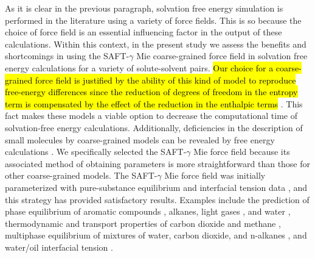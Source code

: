 \documentclass[final,12p,times,twocolumn]{elsarticle}
\begin{document}
	As it is clear in the previous paragraph, solvation free energy simulation is performed in the literature using a variety of force fields. This is so because the choice of force field is an essential influencing factor in the output of these calculations. Within this context, in the present study we assess the benefits and shortcomings in using the SAFT-$\gamma$ Mie coarse-grained force field \cite{avendano2011} in solvation free energy calculations for a variety of solute-solvent pairs. \hl{Our choice for a coarse-grained force field is justified by the ability of this kind of model to reproduce free-energy differences since the reduction of degrees of freedom in the entropy term is compensated by the effect of the reduction in the enthalpic terms} \cite{kmiecik2016}. This fact makes these models a viable option to decrease the computational time of solvation-free energy calculations. Additionally, deficiencies in the description of small molecules by coarse-grained models can be revealed by free energy calculations \cite{mobley2007,shirts2013}. We specifically selected the SAFT-$\gamma$ Mie force field because its associated method of obtaining parameters is more straightforward than those for other coarse-grained models. The SAFT-$\gamma$ Mie force field was initially parameterized with pure-substance equilibrium and interfacial tension data \cite{avendano2011}, and this strategy has provided satisfactory results. Examples include the prediction of phase equilibrium of aromatic compounds \cite{muller2017}, alkanes, light gases \cite{herdes2015}, and water \cite{lobanova2015}, thermodynamic and transport properties of carbon dioxide and methane \cite{cassiano1, cassiano2, cassiano3}, multiphase equilibrium of mixtures of water, carbon dioxide, and n-alkanes \cite{lobanova2016}, and water/oil interfacial tension \cite{herdes2017}.
	
\end{document}
